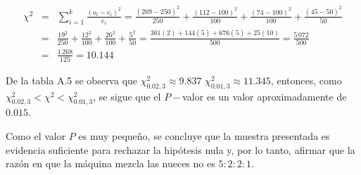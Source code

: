 \begin{solucion}
 \begin{estadistico}
  \begin{eqnarray*}
   \chi^2 & = & \sum_{i=1}^k \frac{\left( o_i - e_i \right)^2}{e_i}
   =\frac{(269 - 250)^2}{250} + \frac{(112 - 100)^2}{100} +
   \frac{(74-100)^2}{100} + \frac{(45-50)^2}{50} \\
   & = & \frac{19^2}{250} + \frac{12^2}{100} + \frac{26^2}{100} +
   \frac{5^2}{50}
   = \frac{361(2) + 144(5) + 676(5) + 25(10)}{500} = \frac{5\,072}{500}\\
   & = & \frac{1\,268}{125} = 10.144
  \end{eqnarray*}
 \end{estadistico}

 \begin{valorp}
  De la tabla A.5 se observa que $\chi^2_{0.02,3} \approx 9.837$
  $\chi^2_{0.01,3} \approx 11.345$,
  entonces, como $\chi^2_{0.02,3} < \chi^2 < \chi^2_{0.01,3}$,
  se sigue que el $P-$valor es un valor aproximadamente de $0.015$.
 \end{valorp}

 \begin{conclusion}
  Como el valor $P$ es muy peque\~no,
  se concluye que la muestra presentada es evidencia suficiente
  para rechazar la hip\'otesis nula y, por lo tanto, afirmar
  que la raz\'on en que la m\'aquina mezcla las nueces no es $5:2:2:1$.
 \end{conclusion}


\end{solucion}
